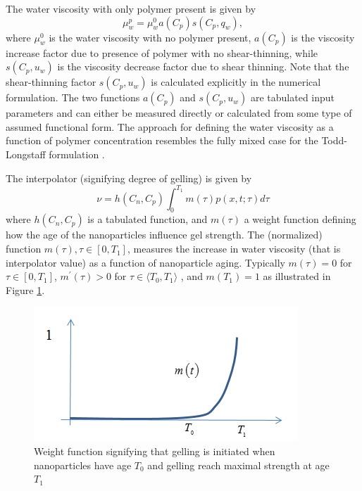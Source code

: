 The water viscosity with only polymer present is given by
\begin{equation}
    \mu_w^p=\mu_w^0 a(C_p) s(C_p, q_w),
\end{equation}
where $\mu_w^0$ is the water viscosity with no polymer present, $a (C_p)$ is the viscosity increase factor due to presence of polymer with no shear-thinning, while $s(C_p, u_w)$ is the viscosity decrease factor due to shear thinning. Note that the shear-thinning factor $s(C_p, u_w)$ is calculated explicitly in the numerical formulation. The two functions $a (C_p)$ and $s(C_p, u_w)$ are tabulated input parameters and can either be measured directly or calculated from some type of assumed functional form. The approach for defining the water viscosity as a function of polymer concentration resembles the fully mixed case for the Todd-Longstaff formulation \citep{slb2015}.   

The interpolator (signifying degree of gelling) is given by
\begin{equation} \label{eq:ageEffect} %
    \nu=h(C_n,C_p) \int^{T_1}_{0}m(\tau)p(x,t;\tau)d\tau
\end{equation}
where $h(C_n,C_p)$ is a tabulated function, and $m(\tau)$ a weight function defining how the age of the nanoparticles influence gel strength. The (normalized) function $m(\tau), \tau\in[0,T_1]$, measures the increase in water viscosity (that is interpolator value) as a function of nanoparticle aging. Typically $m(\tau)=0$ for $\tau\in[0,T_1]$,  $m^\prime(\tau)>0$ for $\tau\in\langle T_0, T_1\rangle$ , and $m(T_1)=1$ as illustrated in Figure \ref{fig:weightFunc}.

\begin{figure}[h]
    \centering
    \includegraphics[width=.85\textwidth]{img/fig/weightFunc.png}
    \caption{Weight function signifying that gelling is initiated when nanoparticles have age $T_0$ and gelling reach maximal strength at age $T_1$}
    \label{fig:weightFunc}
\end{figure}

